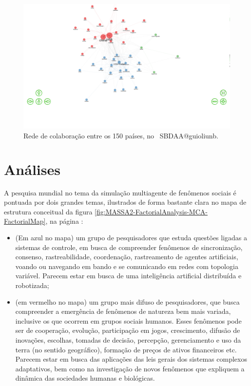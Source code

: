 \begin{figure}
    \centering
    \includegraphics[width=1\textwidth]{experiments/jhcf/PesqBibliogr/SimulacaoMultiagente/WoS-20220203/Estrutura/Social/MASSA2-Collaboration-Network-50country.png}
    \caption{Rede de colaboração entre os 150 países, no  \dataset\ SBDAA@guioliunb.}
    \label{fig:MASSA2-Collaboration-Network-50country}
\end{figure}


\section{Análises\label{MASSA2:Analises}}

A pesquisa mundial no tema da simulação multiagente de fenômenos sociais é pontuada por dois grandes temas, ilustrados de forma bastante clara no mapa de estrutura conceitual da figura \ref{fig:MASSA2-FactorialAnalysis-MCA-FactorialMap}, na página \pageref{fig:MASSA2-FactorialAnalysis-MCA-FactorialMap}:
\begin{itemize}
    \item 
(Em azul no mapa) um grupo de pesquisadores que estuda questões ligadas a sistemas de controle, em busca de compreender fenômenos de sincronização, consenso, rastreabilidade, coordenação, rastreamento de agentes artificiais, voando ou navegando em bando e se comunicando em redes com topologia variável. Parecem estar em busca de uma inteligência artificial distribuída e robotizada;
\item (em vermelho no mapa) um grupo mais difuso de pesquisadores, que busca compreender a emergência de fenômenos de natureza bem mais variada, inclusive os que ocorrem em grupos sociais humanos. Esses fenômenos pode ser de cooperação, evolução, participação em jogos, crescimento, difusão de inovações, escolhas, tomadas de decisão, percepção, gerenciamento e uso da terra (no sentido geográfico), formação de preços de ativos financeiros etc. Parecem estar em busca das aplicações das leis gerais dos sistemas complexos adaptativos, bem como na investigação de novos fenômenos que expliquem a dinâmica das sociedades humanas e biológicas.
\end{itemize}

